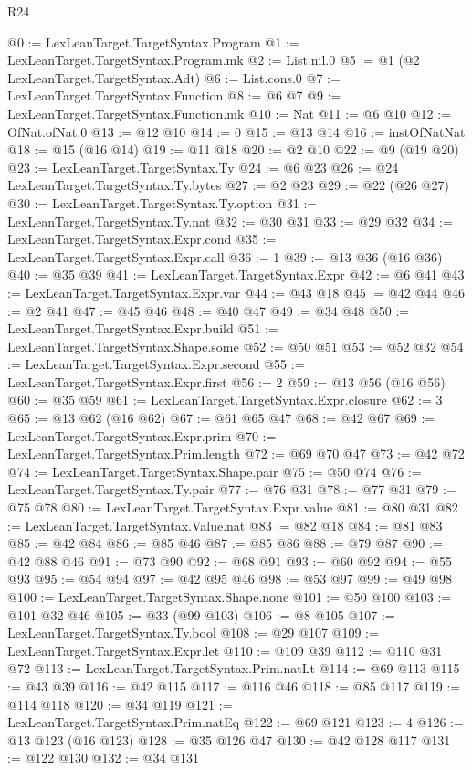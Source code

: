 \begin{lexlean}{R24}
\begin{coremodule}
@0 := LexLeanTarget.TargetSyntax.Program
@1 := LexLeanTarget.TargetSyntax.Program.mk
@2 := List.nil.{0}
@5 := @1 (@2 LexLeanTarget.TargetSyntax.Adt)
@6 := List.cons.{0}
@7 := LexLeanTarget.TargetSyntax.Function
@8 := @6 @7
@9 := LexLeanTarget.TargetSyntax.Function.mk
@10 := Nat
@11 := @6 @10
@12 := OfNat.ofNat.{0}
@13 := @12 @10
@14 := 0
@15 := @13 @14
@16 := instOfNatNat
@18 := @15 (@16 @14)
@19 := @11 @18
@20 := @2 @10
@22 := @9 (@19 @20)
@23 := LexLeanTarget.TargetSyntax.Ty
@24 := @6 @23
@26 := @24 LexLeanTarget.TargetSyntax.Ty.bytes
@27 := @2 @23
@29 := @22 (@26 @27)
@30 := LexLeanTarget.TargetSyntax.Ty.option
@31 := LexLeanTarget.TargetSyntax.Ty.nat
@32 := @30 @31
@33 := @29 @32
@34 := LexLeanTarget.TargetSyntax.Expr.cond
@35 := LexLeanTarget.TargetSyntax.Expr.call
@36 := 1
@39 := @13 @36 (@16 @36)
@40 := @35 @39
@41 := LexLeanTarget.TargetSyntax.Expr
@42 := @6 @41
@43 := LexLeanTarget.TargetSyntax.Expr.var
@44 := @43 @18
@45 := @42 @44
@46 := @2 @41
@47 := @45 @46
@48 := @40 @47
@49 := @34 @48
@50 := LexLeanTarget.TargetSyntax.Expr.build
@51 := LexLeanTarget.TargetSyntax.Shape.some
@52 := @50 @51
@53 := @52 @32
@54 := LexLeanTarget.TargetSyntax.Expr.second
@55 := LexLeanTarget.TargetSyntax.Expr.first
@56 := 2
@59 := @13 @56 (@16 @56)
@60 := @35 @59
@61 := LexLeanTarget.TargetSyntax.Expr.closure
@62 := 3
@65 := @13 @62 (@16 @62)
@67 := @61 @65 @47
@68 := @42 @67
@69 := LexLeanTarget.TargetSyntax.Expr.prim
@70 := LexLeanTarget.TargetSyntax.Prim.length
@72 := @69 @70 @47
@73 := @42 @72
@74 := LexLeanTarget.TargetSyntax.Shape.pair
@75 := @50 @74
@76 := LexLeanTarget.TargetSyntax.Ty.pair
@77 := @76 @31
@78 := @77 @31
@79 := @75 @78
@80 := LexLeanTarget.TargetSyntax.Expr.value
@81 := @80 @31
@82 := LexLeanTarget.TargetSyntax.Value.nat
@83 := @82 @18
@84 := @81 @83
@85 := @42 @84
@86 := @85 @46
@87 := @85 @86
@88 := @79 @87
@90 := @42 @88 @46
@91 := @73 @90
@92 := @68 @91
@93 := @60 @92
@94 := @55 @93
@95 := @54 @94
@97 := @42 @95 @46
@98 := @53 @97
@99 := @49 @98
@100 := LexLeanTarget.TargetSyntax.Shape.none
@101 := @50 @100
@103 := @101 @32 @46
@105 := @33 (@99 @103)
@106 := @8 @105
@107 := LexLeanTarget.TargetSyntax.Ty.bool
@108 := @29 @107
@109 := LexLeanTarget.TargetSyntax.Expr.let
@110 := @109 @39
@112 := @110 @31 @72
@113 := LexLeanTarget.TargetSyntax.Prim.natLt
@114 := @69 @113
@115 := @43 @39
@116 := @42 @115
@117 := @116 @46
@118 := @85 @117
@119 := @114 @118
@120 := @34 @119
@121 := LexLeanTarget.TargetSyntax.Prim.natEq
@122 := @69 @121
@123 := 4
@126 := @13 @123 (@16 @123)
@128 := @35 @126 @47
@130 := @42 @128 @117
@131 := @122 @130
@132 := @34 @131

\end{coremodule}
\end{lexlean}

